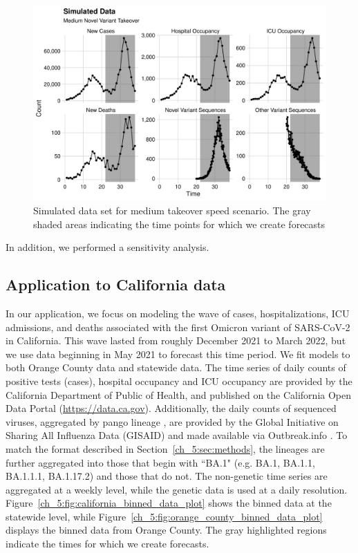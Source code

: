 \begin{figure}
    \centering
    \includegraphics[width=1.0\columnwidth]{simulated_binned_data_medium_plot}
    \caption[Simulated data set for medium takeover speed scenario.]{Simulated data set for medium takeover speed scenario.
    The gray shaded areas indicating the time points for which we create forecasts}
    \label{ch_5:fig:simulated_binned_data_medium_plot}
\end{figure}

In addition, we performed a sensitivity analysis.

\subsection{Application to California data}
\label{ch_5:subsec:application}

In our application, we focus on modeling the wave of cases, hospitalizations, ICU admissions, and deaths associated with the first Omicron variant of SARS-CoV-2 in California.
This wave lasted from roughly December 2021 to March 2022, but we use data beginning in May 2021 to forecast this time period.
We fit models to both Orange County data and statewide data.
The time series of daily counts of positive tests (cases), hospital occupancy and ICU occupancy are provided by the California Department of Public of Health, and published on the California Open Data Portal (\url{https://data.ca.gov}).
Additionally, the daily counts of sequenced viruses, aggregated by pango lineage \citep{pango}, are provided by the Global Initiative on Sharing All Influenza Data (GISAID) \citep{shu2017gisaid} and made available via Outbreak.info \citep{Gangavarapu2023}.
To match the format described in Section~\ref{ch_5:sec:methods}, the lineages are further aggregated into those that begin with ``BA.1" (e.g. BA.1, BA.1.1, BA.1.1.1, BA.1.17.2) and those that do not.
The non-genetic time series are aggregated at a weekly level, while the genetic data is used at a daily resolution.
Figure~\ref{ch_5:fig:california_binned_data_plot} shows the binned data at the statewide level, while Figure~\ref{ch_5:fig:orange_county_binned_data_plot} displays the binned data from Orange County.
The gray highlighted regions indicate the times for which we create forecasts.

